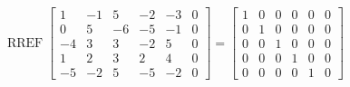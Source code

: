 \begin{exerciseAnswer} 


\[\operatorname{RREF} \left[\begin{array}{ccccc|c}
1 & -1 & 5 & -2 & -3 & 0 \\
0 & 5 & -6 & -5 & -1 & 0 \\
-4 & 3 & 3 & -2 & 5 & 0 \\
1 & 2 & 3 & 2 & 4 & 0 \\
-5 & -2 & 5 & -5 & -2 & 0
\end{array}\right] = \left[\begin{array}{ccccc|c}
1 & 0 & 0 & 0 & 0 & 0 \\
0 & 1 & 0 & 0 & 0 & 0 \\
0 & 0 & 1 & 0 & 0 & 0 \\
0 & 0 & 0 & 1 & 0 & 0 \\
0 & 0 & 0 & 0 & 1 & 0
\end{array}\right] \]



\end{exerciseAnswer}
